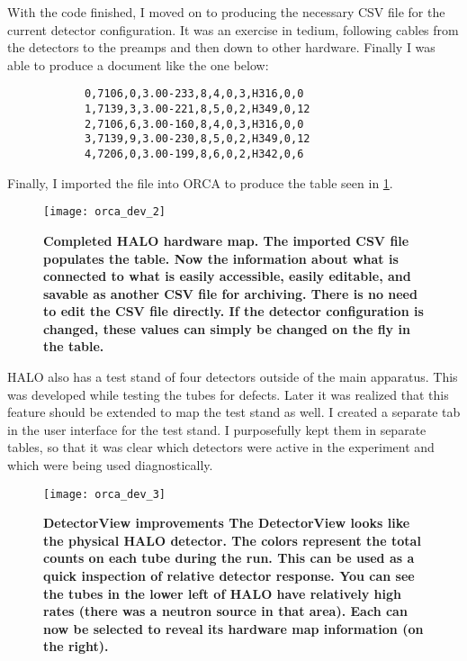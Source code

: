 		With the code finished, I moved on to producing the necessary CSV file for the current detector configuration. It was an exercise in tedium, following cables from the detectors to the preamps and then down to other hardware. Finally I was able to produce a document like the one below:

		\begin{verbatim}
			0,7106,0,3.00-233,8,4,0,3,H316,0,0
			1,7139,3,3.00-221,8,5,0,2,H349,0,12
			2,7106,6,3.00-160,8,4,0,3,H316,0,0
			3,7139,9,3.00-230,8,5,0,2,H349,0,12
			4,7206,0,3.00-199,8,6,0,2,H342,0,6
		\end{verbatim}

		Finally, I imported the file into ORCA to produce the table seen in \FIG \ref{fig:orca_dev_2}.

		\begin{figure}[H]
			\texttt{[image: orca\_dev\_2]}
			\caption[ORCA Development: Completed HALO Hardware Map]{\bf Completed HALO hardware map. \rm The imported CSV file populates the table. Now the information about what is connected to what is easily accessible, easily editable, and savable as another CSV file for archiving. There is no need to edit the CSV file directly. If the detector configuration is changed, these values can simply be changed on the fly in the table.}
			\label{fig:orca_dev_2}
		\end{figure}

		HALO also has a test stand of four \he detectors outside of the main apparatus. This was developed while testing the \he tubes for defects. Later it was realized that this feature should be extended to map the test stand as well. I created a separate tab in the user interface for the test stand. I purposefully kept them in separate tables, so that it was clear which detectors were active in the experiment and which were being used diagnostically. 

		\begin{figure}[H]
			\texttt{[image: orca\_dev\_3]}
			\caption[ORCA Development: DetectorView Improvements]{\bf DetectorView improvements \rm The DetectorView looks like the physical HALO detector. The colors represent the total counts on each \he tube during the run. This can be used as a quick inspection of relative detector response. You can see the tubes in the lower left of HALO have relatively high rates (there was a neutron source in that area). Each \he can now be selected to reveal its hardware map information (on the right).}
			\label{fig:orca_dev_3}
		\end{figure}


